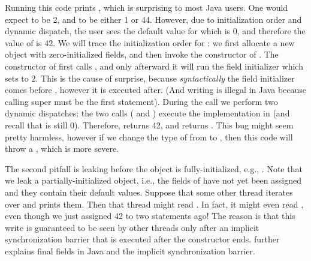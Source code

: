 Running this code prints , which is
    surprising to most Java users.
One would expect  to be 2, and  to be either 1 or 44.
However, due to initialization order and dynamic dispatch,
    the user sees the default value for  which is 0,
    and therefore the value of  is 42.
We will trace the initialization order for :
    we first allocate a new object with zero-initialized fields,
    and then invoke the constructor of .
The constructor of  first calls ,
    and only afterward it will run the field initializer which sets  to 2.
This is the cause of surprise, because \emph{syntactically} the field initializer comes before
    ,
    however it is executed after.
(And writing  is illegal in Java because
    calling super must be the first statement).
During the  call we perform two dynamic dispatches:
    the two calls ( and )
    execute the implementation in  (and recall that  is still 0).
Therefore,  returns 42, and  returns .
This bug might seem pretty harmless,
    however if we change the type of  from  to ,
    then this code will throw a ,
    which is more severe.

The second pitfall is leaking \this before the object is fully-initialized,
    e.g., .
Note that we leak a partially-initialized object, i.e.,
    the fields of  have not yet been assigned and they contain their default values.
Suppose that some other thread iterates over  and prints them.
Then that thread might read .
In fact, it might even read , even though we just assigned 42 to  two statements ago!
The reason is that this write is guaranteed to be seen by other threads only
    after an implicit synchronization barrier that is executed after the constructor ends.
 further explains final fields in Java and the implicit synchronization barrier.



